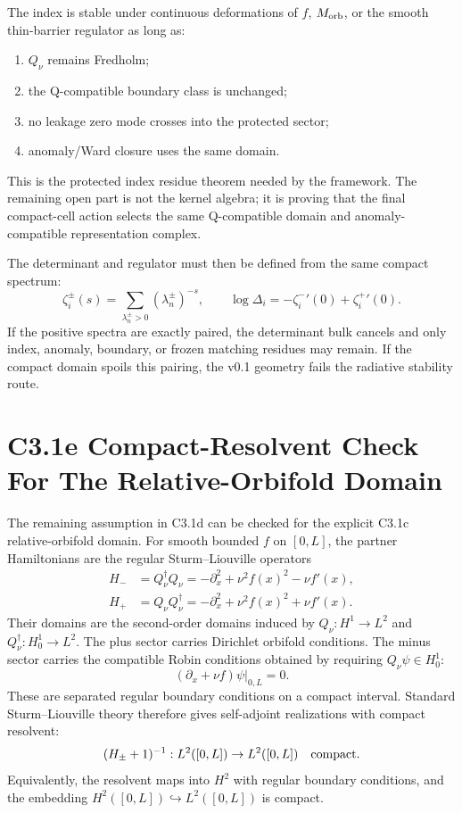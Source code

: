 \documentclass[11pt]{article}
\begin{document}
The index is stable under continuous deformations of $f$, $M_{\rm orb}$, or
the smooth thin-barrier regulator as long as:
\begin{enumerate}
\item $Q_\nu$ remains Fredholm;
\item the Q-compatible boundary class is unchanged;
\item no leakage zero mode crosses into the protected sector;
\item anomaly/Ward closure uses the same domain.
\end{enumerate}
This is the protected index residue theorem needed by the framework.  The
remaining open part is not the kernel algebra; it is proving that the final
compact-cell action selects the same Q-compatible domain and anomaly-compatible
representation complex.

The determinant and regulator must then be defined from the same compact
spectrum:
\begin{equation}
\zeta_i^\pm(s)=\sum_{\lambda_n^\pm>0}(\lambda_n^\pm)^{-s},
\qquad
\log\Delta_i=-\zeta_i^{-}\prime(0)+\zeta_i^{+}\prime(0).
\end{equation}
If the positive spectra are exactly paired, the determinant bulk cancels and
only index, anomaly, boundary, or frozen matching residues may remain.  If the
compact domain spoils this pairing, the v0.1 geometry fails the radiative
stability route.

\section{C3.1e Compact-Resolvent Check For The Relative-Orbifold Domain}
The remaining assumption in C3.1d can be checked for the explicit C3.1c
relative-orbifold domain.  For smooth bounded $f$ on $[0,L]$, the partner
Hamiltonians are the regular Sturm--Liouville operators
\begin{align}
H_- &= Q_\nu^\dagger Q_\nu
     =-\partial_x^2+\nu^2 f(x)^2-\nu f'(x),\\
H_+ &= Q_\nu Q_\nu^\dagger
     =-\partial_x^2+\nu^2 f(x)^2+\nu f'(x).
\end{align}
Their domains are the second-order domains induced by
$Q_\nu:H^1\to L^2$ and $Q_\nu^\dagger:H^1_0\to L^2$.  The plus sector carries
Dirichlet orbifold conditions.  The minus sector carries the compatible Robin
conditions obtained by requiring $Q_\nu\psi\in H^1_0$:
\begin{equation}
(\partial_x+\nu f)\psi\big|_{0,L}=0 .
\end{equation}
These are separated regular boundary conditions on a compact interval.  Standard
Sturm--Liouville theory therefore gives self-adjoint realizations with compact
resolvent:
\begin{equation}
(H_\pm+1)^{-1}:L^2([0,L])\to L^2([0,L])
\quad\hbox{compact} .
\end{equation}
Equivalently, the resolvent maps into $H^2$ with regular boundary conditions,
and the embedding $H^2([0,L])\hookrightarrow L^2([0,L])$ is compact.
\end{document}

